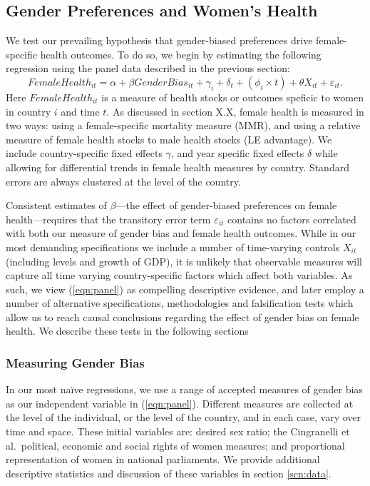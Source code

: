 \documentclass[11pt]{article}
\begin{document}
\begin{spacing}{1.4}
\subsection{Gender Preferences and Women's Health}
We test our prevailing hypothesis that gender-biased preferences drive female-%
specific health outcomes.  To do so, we begin by estimating the following 
regression using the panel data described in the previous section:
\begin{equation}
\label{eqn:panel}
FemaleHealth_{it} = \alpha + \beta GenderBias_{it} + \gamma_i + \delta_t + 
               (\phi_i\times t) + \theta X_{it} + \varepsilon_{it}.
\end{equation}
Here $FemaleHealth_{it}$ is a measure of health stocks or outcomes speficic 
to women in country $i$ and time $t$.  As discussed in section X.X,
female health is measured in two ways: using a female-specific mortality measure
(MMR), and using a relative measure of female health stocks to male health stocks 
(LE advantage).  We include country-specific fixed effects $\gamma$, and year 
specific fixed effects $\delta$ while allowing for differential trends in female 
health measures by country.  Standard errors are always clustered at the level
of the country.

Consistent estimates of $\beta$---the effect of gender-biased preferences on
female health---requires that the transitory error term $\varepsilon_{it}$
contains no factors correlated with both our measure of gender bias and female 
health outcomes.  While in our most demanding specifications we include a 
number of time-varying controls $X_{it}$ (including levels and growth of GDP), 
it is unlikely that observable 
measures will capture all time varying country-specific factors which affect
both variables.  As such, we view (\ref{eqn:panel}) as compelling descriptive 
evidence, and later employ a number of alternative specifications, methodologies 
and falsification tests which allow us to reach causal conclusions regarding the 
effect of gender bias on female health.  We describe these tests in the following 
sections 

\subsubsection{Measuring Gender Bias}
\label{ssscn:gendbias}
In our most na\"ive regressions, we use a range of accepted measures of gender
bias as our independent variable in (\ref{eqn:panel}).  Different measures are 
collected at the level of the individual, or the level of the country, and in
each case, vary over time and space.  These initial variables are: desired sex
ratio; the Cingranelli et al.\ political, economic and social rights of women
measures; and proportional representation of women in national parliaments. We
provide additional descriptive statistics and discussion of these variables in 
section \ref{scn:data}.


\end{spacing}
\end{document}
